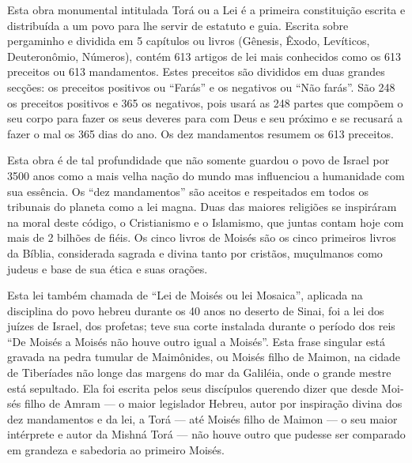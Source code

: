 Esta obra monumental intitulada Torá ou a Lei é a primeira
cons­tituição escrita e distribuída a um povo para lhe servir de
estatuto e guia. Escrita sobre pergaminho e dividida em 5 capítulos ou
livros (Gênesis, Êxodo, Levíticos, Deuteronômio, Números), contém 613
artigos de lei mais conhecidos como os 613 preceitos ou 613 mandamentos.
Estes preceitos são divididos em duas grandes sec­ções: os preceitos
positivos ou ``Farás'' e os negativos ou ``Não farás''. São 248 os preceitos
positivos e 365 os negativos, pois usará as 248 partes que compõem o seu
corpo para fazer os seus deveres para com Deus e seu próximo e se
recusará a fazer o mal os 365 dias do ano. Os dez mandamentos resumem os
613 preceitos.

Esta obra é de tal profundidade que não somente guardou o povo de Israel
por 3500 anos como a mais velha nação do mundo mas influenciou a
huma­nidade com sua essência. Os ``dez mandamentos'' são aceitos e
respeitados em to­dos os tribunais do planeta como a lei magna. Duas das
maiores religiões se inspirá­ram na moral deste código, o Cristianismo e
o Islamismo, que juntas contam hoje com mais de 2 bilhões de fiéis. Os
cinco livros de Moisés são os cinco primeiros livros da Bíblia,
considerada sagrada e divina tanto por cristãos, muçulmanos como judeus
e base de sua ética e suas orações.

Esta lei também chamada de ``Lei de Moisés ou lei Mosaica'', aplicada na
disciplina do povo hebreu durante os 40 anos no deserto de Sinai, foi a
lei dos juízes de Israel, dos profetas; teve sua corte instalada durante
o período dos reis
``De Moisés a Moisés não houve outro igual a Moisés''. Esta frase
singu­lar está gravada na pedra tumular de Maimônides, ou Moisés filho
de Maimon, na cidade de Tiberíades não longe das margens do mar da
Galiléia, onde o grande mestre está sepultado. Ela foi escrita pelos
seus discípulos querendo dizer que desde Moi­sés filho de Amram --- o
maior legislador Hebreu, autor por inspiração divina dos dez mandamentos
e da lei, a Torá --- até Moisés filho de Maimon --- o seu maior
intérprete e autor da Mishná Torá --- não houve outro que
pudesse ser compara­do em grandeza e sabedoria ao primeiro Moisés.

